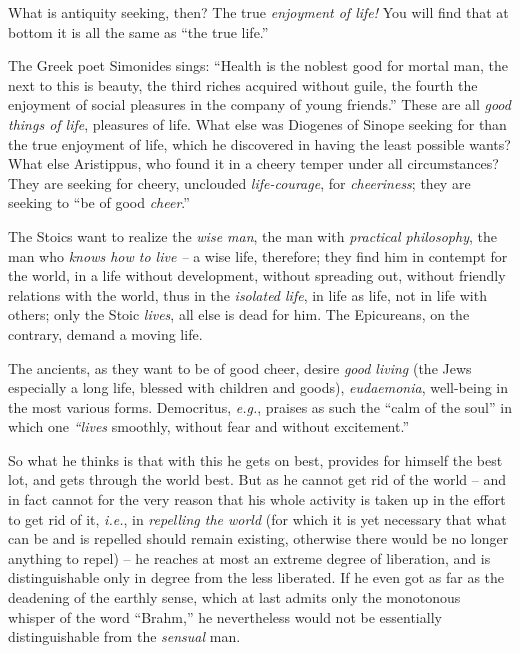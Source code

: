\documentclass[12pt,a4paper]{book}
\begin{document}
What is antiquity seeking, then? The true \textit{enjoyment of life!} You will 
find that at bottom it is all the same as ``the true life.''

The Greek poet Simonides sings: ``Health is the noblest good for mortal man, 
the next to this is beauty, the third riches acquired without guile, the 
fourth the enjoyment of social pleasures in the company of young friends.'' 
These are all \textit{good things of life}, pleasures of life. What else was 
Diogenes of Sinope seeking for than the true enjoyment of life, which he 
discovered in having the least possible wants? What else Aristippus, who found 
it in a cheery temper under all circumstances? They are seeking for cheery, 
unclouded \textit{life-courage}, for \textit{cheeriness}; they are seeking to 
``be of good \textit{cheer}.''

The Stoics want to realize the \textit{wise man}, the man with 
\textit{practical philosophy}, the man who \textit{knows how to live --} a 
wise life, therefore; they find him in contempt for the world, in a life 
without development, without spreading out, without friendly relations with 
the world, thus in the \textit{isolated life}, in life as life, not in life 
with others; only the Stoic \textit{lives}, all else is dead for him. The 
Epicureans, on the contrary, demand a moving life.

The ancients, as they want to be of good cheer, desire \textit{good living} 
(the Jews especially a long life, blessed with children and goods), 
\textit{eudaemonia}, well-being in the most various forms. Democritus, 
\textit{e.g.}, praises as such the ``calm of the soul'' in which one 
\textit{``lives} smoothly, without fear and without excitement.''

So what he thinks is that with this he gets on best, provides for himself the 
best lot, and gets through the world best. But as he cannot get rid of the 
world -- and in fact cannot for the very reason that his whole activity is 
taken up in the effort to get rid of it, \textit{i.e.}, in \textit{repelling 
the world} (for which it is yet necessary that what can be and is repelled 
should remain existing, otherwise there would be no longer anything to repel) 
-- he reaches at most an extreme degree of liberation, and is distinguishable 
only in degree from the less liberated. If he even got as far as the deadening 
of the earthly sense, which at last admits only the monotonous whisper of the 
word ``Brahm,'' he nevertheless would not be essentially distinguishable 
from the \textit{sensual} man.
\end{document}
